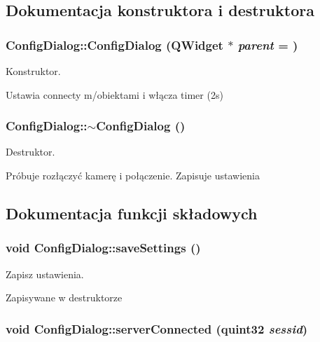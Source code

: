 \subsection{Dokumentacja konstruktora i destruktora}
\hypertarget{class_config_dialog_ad16df8ed2e55bd5cc55e3ef9040b8b93}{
\subsubsection[{ConfigDialog}]{\setlength{\rightskip}{0pt plus 5cm}ConfigDialog::ConfigDialog (QWidget $\ast$ {\em parent} = {})}}
\label{class_config_dialog_ad16df8ed2e55bd5cc55e3ef9040b8b93}


Konstruktor. 

Ustawia connecty m/obiektami i włącza timer (2s) \hypertarget{class_config_dialog_a485badac4dffa04603f800bb9d396e1d}{
\subsubsection[{$\sim$ConfigDialog}]{\setlength{\rightskip}{0pt plus 5cm}ConfigDialog::$\sim$ConfigDialog ()}}
\label{class_config_dialog_a485badac4dffa04603f800bb9d396e1d}


Destruktor. 

Próbuje rozłączyć kamerę i połączenie. Zapisuje ustawienia 

\subsection{Dokumentacja funkcji składowych}
\hypertarget{class_config_dialog_adfe6884aef5e1c04ce574c6c9a1a97d9}{
\subsubsection[{saveSettings}]{\setlength{\rightskip}{0pt plus 5cm}void ConfigDialog::saveSettings ()}}
\label{class_config_dialog_adfe6884aef5e1c04ce574c6c9a1a97d9}


Zapisz ustawienia. 

Zapisywane w destruktorze \hypertarget{class_config_dialog_a5611fa4c9de2827139161cd75a7f4be6}{
\subsubsection[{serverConnected}]{\setlength{\rightskip}{0pt plus 5cm}void ConfigDialog::serverConnected (quint32 {\em sessid})}}
\label{class_config_dialog_a5611fa4c9de2827139161cd75a7f4be6}


